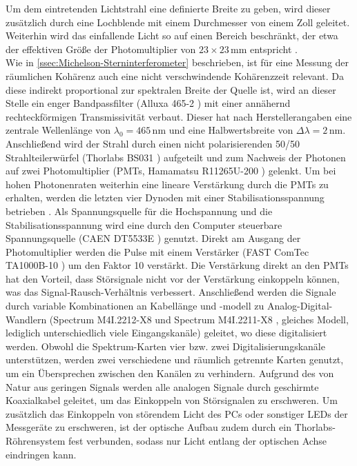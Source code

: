 Um dem eintretenden Lichtstrahl eine definierte Breite zu geben, wird dieser zusätzlich durch eine Lochblende mit einem Durchmesser von einem Zoll geleitet. 
Weiterhin wird das einfallende Licht so auf einen Bereich beschränkt, der etwa der effektiven Größe der Photomultiplier von $23\times 23\,\mathrm{mm}$ entspricht \cite{PhotomultiplierTubeR11265U200}. \\
Wie in \autoref{ssec:Michelson-Sterninterferometer} beschrieben, ist für eine Messung der räumlichen Kohärenz auch eine nicht verschwindende Kohärenzzeit relevant. 
Da diese indirekt proportional zur spektralen Breite der Quelle ist, wird an dieser Stelle ein enger Bandpassfilter (Alluxa 465-2 \cite{4652OD4Ultra}) mit einer annähernd rechteckförmigen Transmissivität verbaut. 
Dieser hat nach Herstellerangaben eine zentrale Wellenlänge von $\lambda_0 = 465\,\mathrm{nm}$ und eine Halbwertsbreite von  $\Delta\lambda = 2\,\mathrm{nm}$. 
Anschließend wird der Strahl durch einen nicht polarisierenden 50/50 Strahlteilerwürfel (Thorlabs BS031 \cite{ThorlabsBS03150}) aufgeteilt und zum Nachweis der Photonen auf zwei Photomultiplier (PMTs, Hamamatsu R11265U-200 \cite{PhotomultiplierTubeR11265U200}) gelenkt. 
Um bei hohen Photonenraten weiterhin eine lineare Verstärkung durch die PMTs zu erhalten, werden die letzten vier Dynoden mit einer Stabilisationsspannung betrieben \cite{zmijaOpticalIntensityInterferometry2021}. 
Als Spannungsquelle für die Hochspannung und die Stabilisationsspannung wird eine durch den Computer steuerbare Spannungsquelle (CAEN DT5533E \cite{DT5533E}) genutzt. 
Direkt am Ausgang der Photomultiplier werden die Pulse mit einem Verstärker (FAST ComTec TA1000B-10 \cite{TA1000BTimingAmplifier}) um den Faktor 10 verstärkt. 
Die Verstärkung direkt an den PMTs hat den Vorteil, dass Störsignale nicht vor der Verstärkung einkoppeln können, was das Signal-Rausch-Verhältnis verbessert. 
Anschließend werden die Signale durch variable Kombinationen an Kabellänge und -modell zu Analog-Digital-Wandlern (Spectrum M4I.2212-X8 \cite{M4i2212x8Bit} und Spectrum M4I.2211-X8 \cite{M4i2211x8Bit}, gleiches Modell, lediglich unterschiedlich viele Eingangskanäle) geleitet, wo diese digitalisiert werden. 
Obwohl die Spektrum-Karten vier bzw. zwei Digitalisierungskanäle unterstützen, werden zwei verschiedene und räumlich getrennte Karten genutzt, um ein Übersprechen zwischen den Kanälen zu verhindern. 
Aufgrund des von Natur aus geringen Signals werden alle analogen Signale durch geschirmte Koaxialkabel geleitet, um das Einkoppeln von Störsignalen zu erschweren. 
Um zusätzlich das Einkoppeln von störendem Licht des PCs oder sonstiger LEDs der Messgeräte zu erschweren, ist der optische Aufbau zudem durch ein Thorlabs-Röhrensystem fest verbunden, sodass nur Licht entlang der optischen Achse eindringen kann. 
